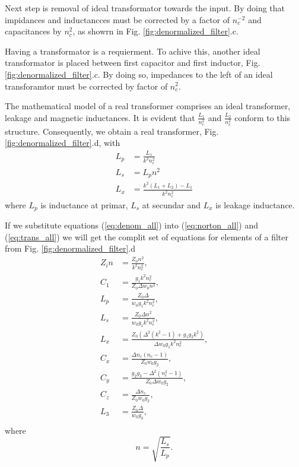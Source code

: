 \documentclass[lettersize,journal]{IEEEtran}
\begin{document}
Next step is removal of ideal transformator towards the input. By doing that impidances and inductancces must be corrected by a factor of $n_c^{-2}$ and capacitances by $n_c^2$, as showrn in Fig. \ref{fig:denormalized_filter}.c.

Having a transformator is a requierment. To achive this, another ideal transformator is placed between first capacitor and first inductor, Fig. \ref{fig:denormalized_filter}.c. By doing so, impedances to the left of an ideal transforamtor must be corrected by factor of $n_c^2$.

The mathematical model of a real transformer comprises an ideal transformer, leakage and magnetic inductances. It is evident that $\frac{L_1}{n_c^2}$ and $\frac{L_2}{n_c^2}$ conform to this structure. Consequently, we obtain a real transformer, Fig. \ref{fig:denormalized_filter}.d, with
%
\begin{subequations} \label{eq:trans_all}
	\begin{align}
		L_p &= \frac{L_1}{k^2 n_c^2} \label{eq:trans_p} \\
		L_s &= L_p n^2 \label{eq:trans_s} \\
	    L_x &= \frac{k^2(L_1 + L_2) - L_1}{k^2 n_c^2} \label{eq:trans_x}
	\end{align}
\end{subequations}
%
where $L_p$ is inductance at primar, $L_s$ at secundar and $L_x$ is leakage inductance.

If we substitute equations (\ref{eq:denom_all}) into (\ref{eq:norton_all}) and (\ref{eq:trans_all}) we will get the complit set of equations for elements of a filter from Fig. \ref{fig:denormalized_filter}.d
%
\begin{subequations} \label{eq:all}
	\begin{align}
		Z_in &= \frac{Z_0 n^2}{k^2 n_c^2}, \label{eq:zin} \\
		C_1 &= \frac{g_1 k^2 n_c^2}{Z_0 \Delta w_0 n^2}, \label{eq:c1} \\
	    L_p &= \frac{Z_0 \Delta}{w_0 g_1 k^2 n_c^2}, \label{eq:lp} \\
	    L_s &= \frac{Z_0 \Delta n^2}{w_0 g_1 k^2 n_c^2}, \label{eq:lp} \\
	    L_x &= \frac{Z_0(\Delta^2(k^2 - 1) + g_1g_2k^2)}{\Delta w_0 g_1k^2n_c^2}, \label{eq:lx} \\
	    C_x &= \frac{\Delta n_c (n_c - 1)}{Z_0 w_0 g_2}, \label{eq:cx} \\
	    C_y &= \frac{g_2 g_3 - \Delta^2 (n_c^2 - 1)}{Z_0 \Delta w_0 g_2}, \label{eq:cy} \\
	    C_z &= \frac{\Delta n_c}{Z_0 w_0 g_2}, \label{eq:cz} \\
	    L_3 &= \frac{Z_0 \Delta}{w_0 g_3}, \label{eq:l3} \\
	\end{align}
\end{subequations}
%
where
%
\begin{equation}
	\label{eq:all_n}
	n = \sqrt{\frac{L_s}{L_p}}.
\end{equation}
\end{document}
